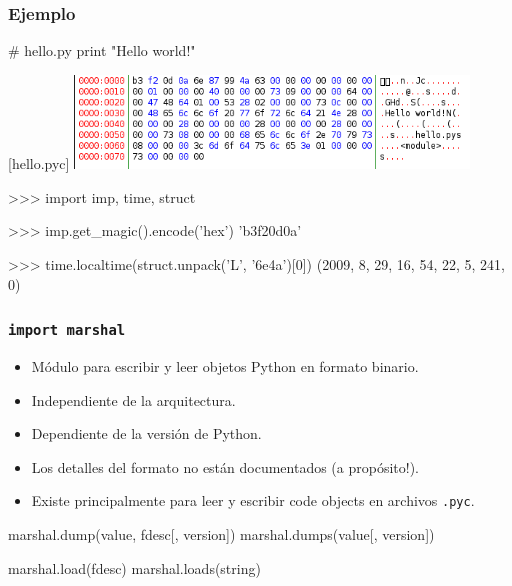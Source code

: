 \documentclass[9pt, notes=hide]{beamer}
\begin{document}
\begin{frame}[fragile]
    \frametitle{Ejemplo}

    \begin{python}
# hello.py
print "Hello world!"
    \end{python}

    \vspace{0.25cm}

    [hello.pyc]
    \includegraphics[height=2.5cm]{images/hello_pyc.png}

    \vspace{0.25cm}

    \begin{python}
>>> import imp, time, struct

>>> imp.get_magic().encode('hex')
'b3f20d0a'

>>> time.localtime(struct.unpack('L', '\x6e\x4a')[0])
(2009, 8, 29, 16, 54, 22, 5, 241, 0)

    \end{python}

\end{frame}


\begin{frame}[fragile]
    \frametitle{\texttt{import marshal}}

    \begin{itemize}
        \item Módulo para escribir y leer objetos Python en formato binario.
        \item Independiente de la arquitectura.
        \item Dependiente de la versión de Python.
        \item Los detalles del formato no están documentados (a propósito!).
        \item Existe principalmente para leer y escribir code objects en archivos \texttt{.pyc}.
    \end{itemize}

\begin{python}
marshal.dump(value, fdesc[, version])
marshal.dumps(value[, version])

marshal.load(fdesc)
marshal.loads(string)
\end{python}

\end{frame}
\end{document}
